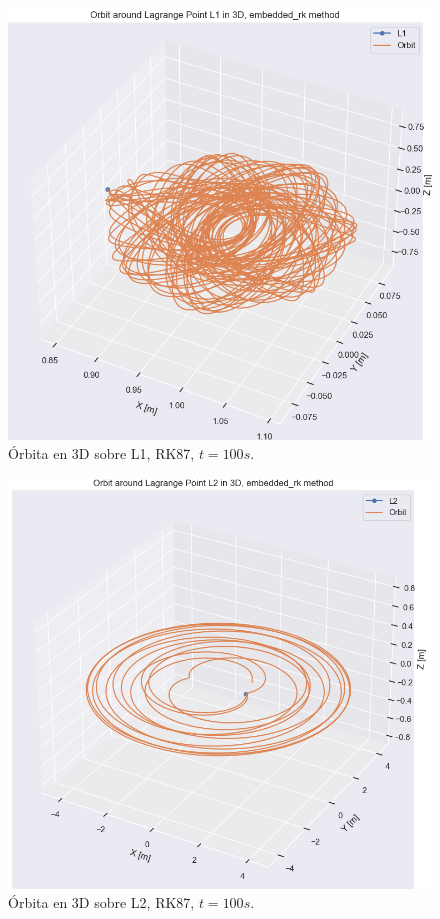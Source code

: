 \documentclass[12pt,a4paper]{article}
\begin{document}
\begin{figure}[H]
	\centering
	\includegraphics[width=\x\textwidth]{FIGURES/mil6/L1_orbit_erk_t100.png}
	\caption{Órbita en 3D sobre L1, RK87, $t = 100 s$.}
	\label{L1_orbit_erk_t100}
\end{figure}
\begin{figure}[H]
	\centering
	\includegraphics[width=\x\textwidth]{FIGURES/mil6/L2_orbit_erk_t100.png}
	\caption{Órbita en 3D sobre L2, RK87, $t = 100 s$.}
	\label{L2_orbit_erk_t100}
\end{figure}
\end{document}
